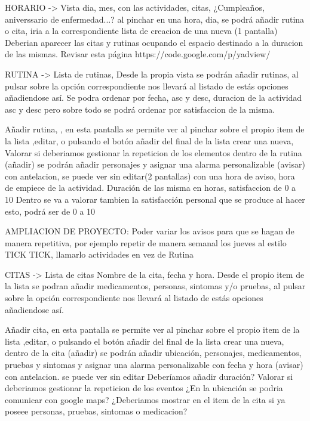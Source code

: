 \documentclass[../pfc.tex]{subfiles}
\begin{document}
	HORARIO -> 		Vista dia, mes, con las actividades, citas, ¿Cumpleaños, aniverssario de enfermedad...?  
	al pinchar en una hora, dia, se podrá añadir rutina o cita, iria a la correspondiente lista de creacion de una nueva (1 pantalla)
	Deberian aparecer las citas y rutinas ocupando el espacio destinado a la duracion de las mismas.
	Revisar esta página
	https://code.google.com/p/yadview/
	
	RUTINA -> 		Lista de rutinas,
	Desde la propia vista se podrán añadir rutinas, al pulsar sobre la opción correspondiente nos llevará al listado de estás opciones añadiendose así.
	Se podra ordenar por fecha, asc y desc, duracion de la actividad asc y desc pero sobre todo se podrá ordenar por satisfaccion de la misma.
	
	
	Añadir rutina, , en esta pantalla se permite ver al pinchar sobre el propio item de la lista ,editar, o pulsando el botón añadir del final de la lista crear una nueva,
	Valorar si deberiamos gestionar la repeticion de los elementos					
	dentro de la rutina (añadir) se podrán añadir personajes y asignar una alarma personalizable (avisar) con antelacion, se puede ver sin editar(2 pantallas)
	con una hora de aviso, hora de empiece de la actividad. Duración de las misma en horas, satisfaccion de 0 a 10
	Dentro se va a valorar tambien la satisfacción personal que se produce al hacer esto, podrá ser de 0 a 10
	
	AMPLIACION DE PROYECTO: Poder variar los avisos para que se hagan de manera repetitiva, por ejemplo repetir de manera semanal los jueves al estilo TICK TICK, llamarlo actividades en vez de Rutina 
	
	CITAS -> 		Lista de citas Nombre de la cita, fecha y hora.
	Desde el propio item de la lista se podran añadir medicamentos, personas, sintomas y/o pruebas, al pulsar sobre la opción correspondiente nos llevará al listado de estás opciones añadiendose así.
	
	Añadir cita, en esta pantalla se permite ver al pinchar sobre el propio item de la lista ,editar, o pulsando el botón añadir del final de la lista crear una nueva, 
	dentro de la cita (añadir) se podrán añadir ubicación, personajes, medicamentos, pruebas y sintomas y asignar una alarma personalizable con fecha y hora (avisar) con antelacion.
	se puede ver sin editar
	Deberíamos añadir duración?
	Valorar si deberiamos gestionar la repeticion de los eventos
	¿En la ubicación se podria comunicar con google maps?
	¿Deberiamos mostrar en el item de la cita si ya poseee personas, pruebas, sintomas o medicacion?
	
\end{document}
